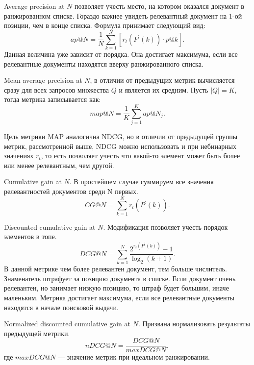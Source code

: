Average precision at $N$ позволяет учесть место, на котором оказался документ в ранжированном списке. Гораздо важнее увидеть релевантный документ на 1-ой позиции, чем в конце списка. Формула принимает
следующий вид: 
\begin{equation}
	\label{eq:map2}
	ap @ N=\frac{1}{N} \sum_{k=1}^N [r_t(P^{\prime}(k)) \cdot p@k].
\end{equation}
Данная величина уже зависит от порядка. Она достигает максимума, если все релевантные документы находятся вверху ранжированного списка.

Mean average precision at $N$, в отличии от предыдущих метрик вычисляется сразу для всех запросов множества $Q$ и является их средним. Пусть $|Q| = K$, тогда метрика записывается как:
\begin{equation}
	\label{eq:map3}
	map @ N=\frac{1}{K} \sum_{j=1}^K ap @ N_j.
\end{equation}

Цель метрики MAP аналогична NDCG, но в отличии от предыдущей группы метрик, рассмотренной выше, NDCG можно использовать и при небинарных значениях $r_t$, то есть позволяет учесть что какой-то элемент может быть более или менее релевантным, чем другой.

Cumulative gain at $N$. В простейшем случае суммируем все значения релевантностей документов среди N первых.
\begin{equation}
	\label{eq:ndcg1}
	CG @ N= \sum_{k=1}^N r_t(P^{\prime}(k)).
\end{equation}

Discounted cumulative gain at $N$. Модификация позволяет учесть порядок элементов в топе.
\begin{equation}
	\label{eq:ndcg2}
	D C G @ N=\sum_{k=1}^N \frac{2^{r_t(P^{\prime}(k))}-1}{\log _2(k+1)}.
\end{equation}
В данной метрике чем более релевантен документ, тем больше числитель. Знаменатель штрафует за позицию документа в списке. Если документ очень релевантен, но занимает низкую позицию, то штраф будет большим, иначе маленьким. Метрика достигает максимума, если все релевантные документы находятся в начале поисковой выдачи.

Normalized discounted cumulative gain at $N$. Призвана нормализовать результаты предыдущей метрики.
\begin{equation}
	\label{eq:ndcg3}
	nD C G @ N=\frac{D C G @ N}{maxD C G @ N},
\end{equation}
где $maxD C G @ N$ --- значение метрик при идеальном ранжировании.

